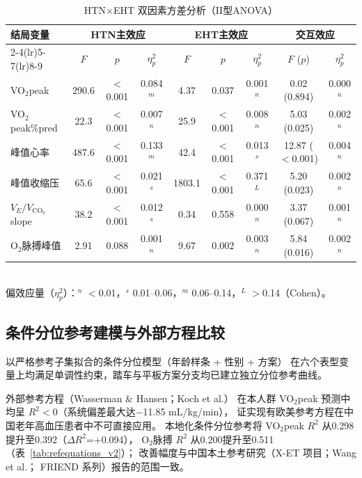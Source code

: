 \documentclass[12pt, a4paper]{ctexart}
\begin{document}
\begin{table}[htbp]
\centering
\small
\caption{HTN$\times$EHT 双因素方差分析（II型ANOVA）}
\label{tab:anova}
\begin{tabular}{lcccccccc}
\toprule
\multirow{2}{*}{结局变量} & \multicolumn{3}{c}{HTN主效应} & \multicolumn{3}{c}{EHT主效应} & \multicolumn{2}{c}{交互效应} \\
\cmidrule(lr){2-4}\cmidrule(lr){5-7}\cmidrule(lr){8-9}
 & $F$ & $p$ & $\eta^2_p$ & $F$ & $p$ & $\eta^2_p$ & $F$ ($p$) & $\eta^2_p$ \\
\midrule
VO$_2$peak & 290.6 & $<$0.001 & 0.084$^m$ & 4.37 & 0.037 & 0.001$^n$ & 0.02 (0.894) & 0.000$^n$ \\
VO$_2$peak\%pred & 22.3 & $<$0.001 & 0.007$^n$ & 25.9 & $<$0.001 & 0.008$^n$ & 5.03 (0.025) & 0.002$^n$ \\
峰值心率 & 487.6 & $<$0.001 & 0.133$^m$ & 42.4 & $<$0.001 & 0.013$^s$ & 12.87 ($<$0.001) & 0.004$^n$ \\
峰值收缩压 & 65.6 & $<$0.001 & 0.021$^s$ & 1803.1 & $<$0.001 & 0.371$^L$ & 5.20 (0.023) & 0.002$^n$ \\
$V_E/V_{\text{CO}_2}$ slope & 38.2 & $<$0.001 & 0.012$^s$ & 0.34 & 0.558 & 0.000$^n$ & 3.37 (0.067) & 0.001$^n$ \\
O$_2$脉搏峰值 & 2.91 & 0.088 & 0.001$^n$ & 9.67 & 0.002 & 0.003$^n$ & 5.84 (0.016) & 0.002$^n$ \\
\bottomrule
\end{tabular}
\\[1ex]
{\footnotesize 偏效应量（$\eta^2_p$）：$^n$ $<$0.01，$^s$ 0.01--0.06，$^m$ 0.06--0.14，$^L$ $>$0.14（Cohen\cite{Cohen1988}）。}
\end{table}

\subsection{条件分位参考建模与外部方程比较}

以严格参考子集拟合的条件分位模型（年龄样条 + 性别 + 方案）
在六个表型变量上均满足单调性约束，踏车与平板方案分支均已建立独立分位参考曲线。

外部参考方程（Wasserman \& Hansen\cite{Wasserman1999}；Koch et al.\cite{Koch2009}）
在本人群 VO$_2$peak 预测中均呈 $R^2<0$（系统偏差最大达$-$11.85 mL/kg/min），
证实现有欧美参考方程在中国老年高血压患者中不可直接应用。
本地化条件分位参考将 VO$_2$peak $R^2$ 从0.298提升至0.392（$\Delta R^2$=+0.094），
O$_2$脉搏 $R^2$ 从0.200提升至0.511（表~\ref{tab:refequations_v2}）；
改善幅度与中国本土参考研究（X-ET 项目\cite{XET2021}；Wang et al.\cite{WangCycle2022}；
FRIEND 系列\cite{FRIEND2022}）报告的范围一致。
\end{document}
